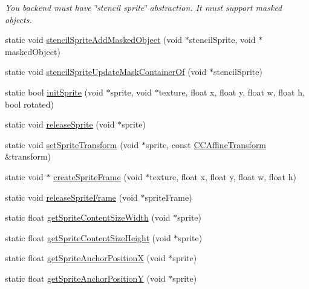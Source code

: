 \begin{DoxyCompactItemize}
\begin{DoxyCompactList}\small\item\em You backend must have \char`\"{}stencil sprite\char`\"{} abstraction. It must support masked objects. \end{DoxyCompactList}\item 
static void \hyperlink{class_g_a_f_1_1_g_a_f_marmalade_g_f_x_a549dc4e4ea1b208815a4efbb8fb3573d}{stencil\-Sprite\-Add\-Masked\-Object} (void $\ast$stencil\-Sprite, void $\ast$masked\-Object)
\item 
static void \hyperlink{class_g_a_f_1_1_g_a_f_marmalade_g_f_x_abc8a09dd883016053e10b31b6cdc4f5d}{stencil\-Sprite\-Update\-Mask\-Container\-Of} (void $\ast$stencil\-Sprite)
\item 
static bool \hyperlink{class_g_a_f_1_1_g_a_f_marmalade_g_f_x_a2026106206694ae8479daee70e25ac77}{init\-Sprite} (void $\ast$sprite, void $\ast$texture, float x, float y, float w, float h, bool rotated)
\item 
static void \hyperlink{class_g_a_f_1_1_g_a_f_marmalade_g_f_x_a6903462f1f840fff5a45312cda08c5e3}{release\-Sprite} (void $\ast$sprite)
\item 
static void \hyperlink{class_g_a_f_1_1_g_a_f_marmalade_g_f_x_accfa7a7c4665d5613a5c185603c2ae47}{set\-Sprite\-Transform} (void $\ast$sprite, const \hyperlink{class_g_a_f_1_1_c_c_affine_transform}{C\-C\-Affine\-Transform} \&transform)
\item 
static void $\ast$ \hyperlink{class_g_a_f_1_1_g_a_f_marmalade_g_f_x_aa85e3d2d9c75297bbadcb8f36beef8d7}{create\-Sprite\-Frame} (void $\ast$texture, float x, float y, float w, float h)
\item 
static void \hyperlink{class_g_a_f_1_1_g_a_f_marmalade_g_f_x_adc04e3b9f1e994a2bcebeadd88bd84ec}{release\-Sprite\-Frame} (void $\ast$sprite\-Frame)
\item 
static float \hyperlink{class_g_a_f_1_1_g_a_f_marmalade_g_f_x_a1cf7a56263c10187a2e154ba73c924f5}{get\-Sprite\-Content\-Size\-Width} (void $\ast$sprite)
\item 
static float \hyperlink{class_g_a_f_1_1_g_a_f_marmalade_g_f_x_a4820e51a219e807d0f1bf2f31faa7a4e}{get\-Sprite\-Content\-Size\-Height} (void $\ast$sprite)
\item 
static float \hyperlink{class_g_a_f_1_1_g_a_f_marmalade_g_f_x_a11fbebb5124bfc2a2f442eda4d0f8dc7}{get\-Sprite\-Anchor\-Position\-X} (void $\ast$sprite)
\item 
static float \hyperlink{class_g_a_f_1_1_g_a_f_marmalade_g_f_x_a77414124423838b04cd30cf983b7c664}{get\-Sprite\-Anchor\-Position\-Y} (void $\ast$sprite)

\end{DoxyCompactItemize}
